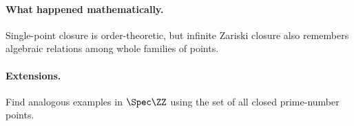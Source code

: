 \paragraph{What happened mathematically.}
Single-point closure is order-theoretic, but infinite Zariski closure also remembers
algebraic relations among whole families of points.

\paragraph{Extensions.}
Find analogous examples in $\Spec\ZZ$ using the set of all closed prime-number points.
